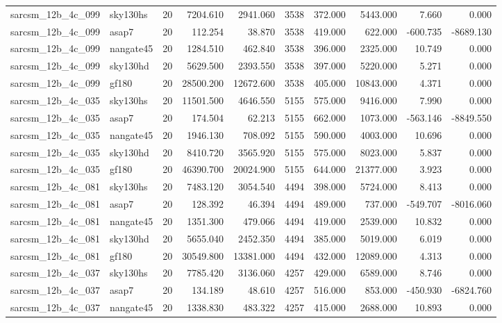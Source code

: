 \documentclass{article}
\begin{document}
\begin{longtable}{llrrrrrrrr}
sarcsm\_12b\_4c\_099 & sky130hs & 20 & 7204.610 & 2941.060 & 3538 & 372.000 & 5443.000 & 7.660 & 0.000 \\
sarcsm\_12b\_4c\_099 & asap7 & 20 & 112.254 & 38.870 & 3538 & 419.000 & 622.000 & -600.735 & -8689.130 \\
sarcsm\_12b\_4c\_099 & nangate45 & 20 & 1284.510 & 462.840 & 3538 & 396.000 & 2325.000 & 10.749 & 0.000 \\
sarcsm\_12b\_4c\_099 & sky130hd & 20 & 5629.500 & 2393.550 & 3538 & 397.000 & 5220.000 & 5.271 & 0.000 \\
sarcsm\_12b\_4c\_099 & gf180 & 20 & 28500.200 & 12672.600 & 3538 & 405.000 & 10843.000 & 4.371 & 0.000 \\
sarcsm\_12b\_4c\_035 & sky130hs & 20 & 11501.500 & 4646.550 & 5155 & 575.000 & 9416.000 & 7.990 & 0.000 \\
sarcsm\_12b\_4c\_035 & asap7 & 20 & 174.504 & 62.213 & 5155 & 662.000 & 1073.000 & -563.146 & -8849.550 \\
sarcsm\_12b\_4c\_035 & nangate45 & 20 & 1946.130 & 708.092 & 5155 & 590.000 & 4003.000 & 10.696 & 0.000 \\
sarcsm\_12b\_4c\_035 & sky130hd & 20 & 8410.720 & 3565.920 & 5155 & 575.000 & 8023.000 & 5.837 & 0.000 \\
sarcsm\_12b\_4c\_035 & gf180 & 20 & 46390.700 & 20024.900 & 5155 & 644.000 & 21377.000 & 3.923 & 0.000 \\
sarcsm\_12b\_4c\_081 & sky130hs & 20 & 7483.120 & 3054.540 & 4494 & 398.000 & 5724.000 & 8.413 & 0.000 \\
sarcsm\_12b\_4c\_081 & asap7 & 20 & 128.392 & 46.394 & 4494 & 489.000 & 737.000 & -549.707 & -8016.060 \\
sarcsm\_12b\_4c\_081 & nangate45 & 20 & 1351.300 & 479.066 & 4494 & 419.000 & 2539.000 & 10.832 & 0.000 \\
sarcsm\_12b\_4c\_081 & sky130hd & 20 & 5655.040 & 2452.350 & 4494 & 385.000 & 5019.000 & 6.019 & 0.000 \\
sarcsm\_12b\_4c\_081 & gf180 & 20 & 30549.800 & 13381.000 & 4494 & 432.000 & 12089.000 & 4.313 & 0.000 \\
sarcsm\_12b\_4c\_037 & sky130hs & 20 & 7785.420 & 3136.060 & 4257 & 429.000 & 6589.000 & 8.746 & 0.000 \\
sarcsm\_12b\_4c\_037 & asap7 & 20 & 134.189 & 48.610 & 4257 & 516.000 & 853.000 & -450.930 & -6824.760 \\
sarcsm\_12b\_4c\_037 & nangate45 & 20 & 1338.830 & 483.322 & 4257 & 415.000 & 2688.000 & 10.893 & 0.000 \\

\end{longtable}
\end{document}
